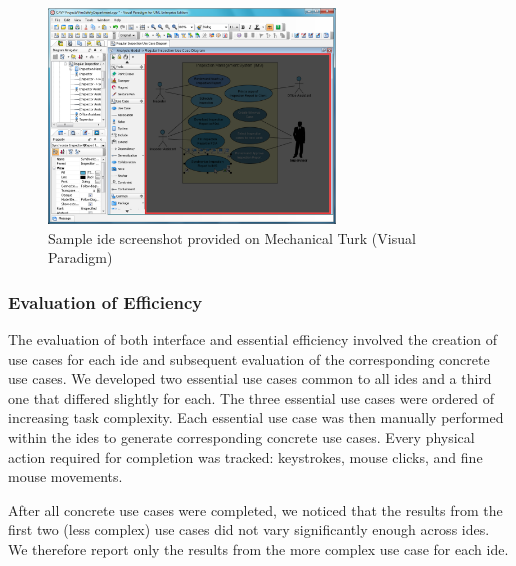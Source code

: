 \begin{figure}[!t]
\centering
\includegraphics[width=3in]{images/clutter_shot}
\caption{Sample \ac{ide} screenshot provided on Mechanical Turk (Visual
Paradigm)}
\label{fig:clutterexample}
\end{figure}


\subsubsection{Evaluation of Efficiency} \label{subsubsec:efficiency}

The evaluation of both interface and essential efficiency involved the creation of use cases for each \ac{ide} and subsequent evaluation of the corresponding concrete use cases.
We developed two essential use cases common to all \acp{ide} and a third one that differed slightly for each.
The three essential use cases were ordered of increasing task complexity.
Each essential use case was then manually performed within the \acp{ide} to generate corresponding concrete use cases.
Every physical action required for completion was tracked: keystrokes, mouse clicks, and fine mouse movements.

After all concrete use cases were completed, we noticed that the results from the first two (less complex) use cases did not vary significantly enough across \acp{ide}.
We therefore report only the results from the more complex use case for each \ac{ide}.

